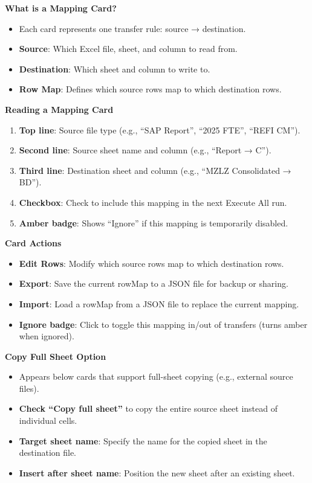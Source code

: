 \documentclass[11pt,a4paper]{article}
\begin{document}
\begin{stepbox}
\textbf{What is a Mapping Card?}
\begin{itemize}[leftmargin=*, itemsep=2pt]
\item Each card represents one transfer rule: source → destination.
\item \textbf{Source}: Which Excel file, sheet, and column to read from.
\item \textbf{Destination}: Which sheet and column to write to.
\item \textbf{Row Map}: Defines which source rows map to which destination rows.
\end{itemize}

\textbf{Reading a Mapping Card}
\begin{enumerate}[leftmargin=*, itemsep=4pt]
\item \textbf{Top line}: Source file type (e.g., ``SAP Report'', ``2025 FTE'', ``REFI CM'').
\item \textbf{Second line}: Source sheet name and column (e.g., ``Report → C'').
\item \textbf{Third line}: Destination sheet and column (e.g., ``MZLZ Consolidated → BD'').
\item \textbf{Checkbox}: Check to include this mapping in the next Execute All run.
\item \textbf{Amber badge}: Shows ``Ignore'' if this mapping is temporarily disabled.
\end{enumerate}

\textbf{Card Actions}
\begin{itemize}[leftmargin=*, itemsep=2pt]
\item \textbf{Edit Rows}: Modify which source rows map to which destination rows.
\item \textbf{Export}: Save the current rowMap to a JSON file for backup or sharing.
\item \textbf{Import}: Load a rowMap from a JSON file to replace the current mapping.
\item \textbf{Ignore badge}: Click to toggle this mapping in/out of transfers (turns amber when ignored).
\end{itemize}

\textbf{Copy Full Sheet Option}
\begin{itemize}[leftmargin=*, itemsep=2pt]
\item Appears below cards that support full-sheet copying (e.g., external source files).
\item \textbf{Check ``Copy full sheet''} to copy the entire source sheet instead of individual cells.
\item \textbf{Target sheet name}: Specify the name for the copied sheet in the destination file.
\item \textbf{Insert after sheet name}: Position the new sheet after an existing sheet.
\end{itemize}
\end{stepbox}
\end{document}
